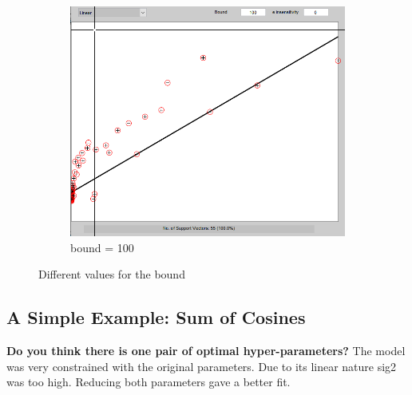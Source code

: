 \documentclass[11pt,oneside,a4paper]{article}
\begin{document}
\begin{figure}[H]
\begin{subfigure}[b]{0.4\textwidth}
		\includegraphics[width=\textwidth]{../Figures/linear_b_100}
		\caption{bound = 100}
	\end{subfigure}
	\caption{Different values for the bound}
	
\end{figure}

\subsection{A Simple Example: Sum of Cosines}

\textbf{Do you think there is one pair of optimal hyper-parameters?}
The model was very constrained with the original parameters. Due to its linear nature sig2 was too high. Reducing both parameters gave a better fit. 
\end{document}
